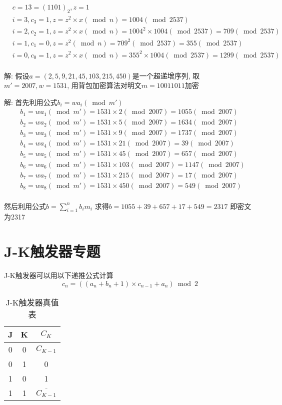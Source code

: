 \documentclass[UTF8]{ctexart}
\begin{document}
\begin{enumerate}
        $$
        \begin{aligned}
          &c=13=(1101)_2, z=1\\
          &i=3, c_3=1, z=z^2\times x(\bmod n)=1004(\bmod 2537)\\
          &i=2, c_2=1, z=z^2\times x(\bmod n)=1004^2\times 1004(\bmod 2537)=709(\bmod 2537)\\
          &i=1, c_1=0, z=z^2(\bmod n)=709^2(\bmod 2537)=355(\bmod 2537)\\
          &i=0, c_0=1, z=z^2\times x(\bmod n)=355^2\times 1004(\bmod 2537)=1299(\bmod 2537)\\
        \end{aligned}
        $$

        解: 假设$a=(2,5,9,21,45,103,215,450)$是一个超递增序列, 取$m'=2007, w=1531$, 用背包加密算法对明文$m=10011011$加密

        解: 首先利用公式$b_i=wa_i(\bmod m')$
        $$
        \begin{aligned}
          &b_1=wa_1(\bmod m')=1531\times 2(\bmod 2007)=1055(\bmod 2007)\\
          &b_2=wa_2(\bmod m')=1531\times 5(\bmod 2007)=1634(\bmod 2007)\\
          &b_3=wa_3(\bmod m')=1531\times 9(\bmod 2007)=1737(\bmod 2007)\\
          &b_4=wa_4(\bmod m')=1531\times 21(\bmod 2007)=39(\bmod 2007)\\
          &b_5=wa_5(\bmod m')=1531\times 45(\bmod 2007)=657(\bmod 2007)\\
          &b_6=wa_6(\bmod m')=1531\times 103(\bmod 2007)=1147(\bmod 2007)\\
          &b_7=wa_7(\bmod m')=1531\times 215(\bmod 2007)=17(\bmod 2007)\\
          &b_8=wa_8(\bmod m')=1531\times 450(\bmod 2007)=549(\bmod 2007)\\
        \end{aligned}
        $$

        然后利用公式$b=\sum\limits_{i=1}^n b_im_i$
        求得$b=1055+39+657+17+549=2317$
        即密文为2317
\end{enumerate}

\section{J-K触发器专题}
J-K触发器可以用以下递推公式计算
$$c_n=((a_n+b_n+1)\times c_{n-1}+a_n)\bmod 2$$

\begin{table}[h]
  \centering
  \caption{J-K触发器真值表}
  \begin{tabular}{|c|c|c|}
    \hline
    J &K &$C_K$\\
    \hline
    0 &0 &$C_{K-1}$\\
    \hline
    0 &1 &0\\
    \hline
    1 &0 &1\\
    \hline
    1 &1 &$\overline{C_{K-1}}$\\
    \hline
  \end{tabular}
\end{table}
\end{document}
